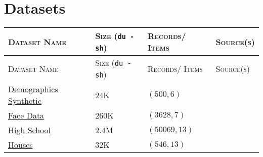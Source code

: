 \chapter{Datasets}\label{Datasets}



\begin{customArrayStretch}{1.3}
\begin{longtable}{
    |
    >{\RaggedRight\arraybackslash}p{5cm}| %
    >{\hfill}p{2.5cm}| %
    >{\hfill}p{3cm}| %
    >{\hfill}p{2cm}| %
}

\hline
    \textsc{Dataset Name} &
    \textsc{Size} (\verb|du -sh|) &
    \textsc{Records/ Items} &
    \textsc{Source(s)} \\
\hline
\endfirsthead

\hline
    \textsc{Dataset Name} &
    \textsc{Size} (\verb|du -sh|) &
    \textsc{Records/ Items} &
    \textsc{Source(s)} \\
\hline
\endhead

\hline \endfoot
\hline \endlastfoot




\href{http://www.nth-iteration.com/wp-content/uploads/2018/08/demographics-synthetic.csv}{Demographics Synthetic} \label{Datasets/nth-iteration/demographics-synthetic} &
$24$K &
$(500, 6)$ &
\cite{statistics/book/Statistics-for-Data-Scientists/Maurits-Kaptein} \\ \hline

\href{http://www.nth-iteration.com/wp-content/uploads/2018/08/face-data.csv}{Face Data} \label{Datasets/nth-iteration/face-data} &
$260$K &
$(3628, 7)$ &
\cite{statistics/book/Statistics-for-Data-Scientists/Maurits-Kaptein} \\ \hline

\href{http://www.nth-iteration.com/wp-content/uploads/2018/08/high-school.csv}{High School} \label{Datasets/nth-iteration/high-school} &
$2.4$M &
$(50069, 13)$ &
\cite{statistics/book/Statistics-for-Data-Scientists/Maurits-Kaptein} \\ \hline

\href{http://www.nth-iteration.com/wp-content/uploads/2018/08/houses.csv}{Houses} \label{Datasets/nth-iteration/houses} &
$32$K &
$(546, 13)$ &
\cite{statistics/book/Statistics-for-Data-Scientists/Maurits-Kaptein} \\ \hline


\end{longtable}
\end{customArrayStretch}

